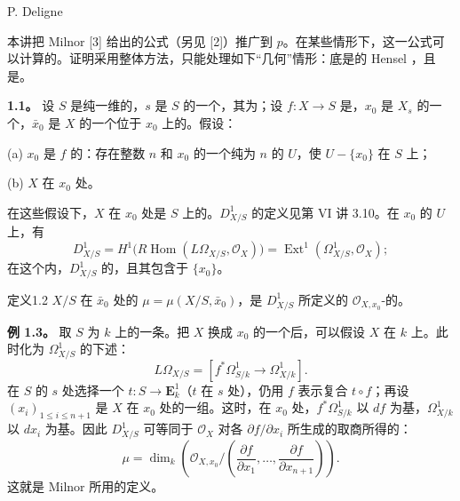 \begin{center}P. Deligne\end{center}

本讲把 Milnor [3] 给出的公式（另见 [2]）推广到 $p$。在某些情形下，这一公式可以计算的。证明采用整体方法，只能处理如下“几何”情形：底是的 Hensel ，且是。

\textbf{1.1。} 设 $S$ 是纯一维的，$s$ 是 $S$ 的一个，其为；设 $f:X\to S$ 是，$x_0$ 是 $X_s$ 的一个，$\bar x_0$ 是 $X$ 的一个位于 $x_0$ 上的。假设：

(a) $x_0$ 是 $f$ 的：存在整数 $n$ 和 $x_0$ 的一个纯为 $n$ 的 $U$，使 $U-\{x_0\}$ 在 $S$ 上；

(b) $X$ 在 $x_0$ 处。

在这些假设下，$X$ 在 $x_0$ 处是 $S$ 上的。$D^1_{X/S}$ 的定义见第 VI 讲 3.10。在 $x_0$ 的 $U$ 上，有
\[
D^1_{X/S}=H^1\bigl(R\operatorname{Hom}(L\Omega_{X/S},\mathscr O_X)\bigr)
=\operatorname{Ext}^1(\Omega^1_{X/S},\mathscr O_X);
\]
在这个内，$D^1_{X/S}$ 的，且其包含于 $\{x_0\}$。

\begin{SGAresult}{定义}{1.2}
$X/S$ 在 $\bar x_0$ 处的  $\mu=\mu(X/S,\bar x_0)$，是 $D^1_{X/S}$ 所定义的 $\mathscr O_{X,x_0}$-的。
\end{SGAresult}

\textbf{例 1.3。} 取 $S$ 为 $k$ 上的一条。把 $X$ 换成 $x_0$ 的一个后，可以假设 $X$ 在 $k$ 上。此时化为 $\Omega^1_{X/S}$ 的下述：
\[
L\Omega_{X/S}=[f^*\Omega^1_{S/k}\longrightarrow\Omega^1_{X/k}].
\]
在 $S$ 的 $s$ 处选择一个 $t:S\to\mathbf E^1_k$（$t$ 在 $s$ 处），仍用 $f$ 表示复合 $t\circ f$；再设 $(x_i)_{1\leq i\leq n+1}$ 是 $X$ 在 $x_0$ 处的一组。这时，在 $x_0$ 处，$f^*\Omega^1_{S/k}$ 以 $df$ 为基，$\Omega^1_{X/k}$ 以 $dx_i$ 为基。因此 $D^1_{X/S}$ 可等同于 $\mathscr O_X$ 对各 $\partial f/\partial x_i$ 所生成的取商所得的：
\[
\mu=\dim_k\left(\mathscr O_{X,x_0}/
\left(\frac{\partial f}{\partial x_1},\ldots,\frac{\partial f}{\partial x_{n+1}}\right)\right).
\tag{1.3.1}
\]
这就是 Milnor 所用的定义。

